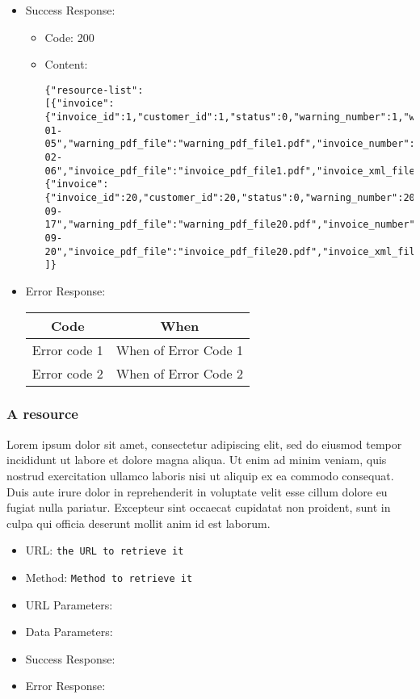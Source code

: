 \begin{itemize}
    \item Success Response: 
    \begin{itemize}
        \item Code: 200
        \item Content:
        \begin{lstlisting}
{"resource-list":
[{"invoice":{"invoice_id":1,"customer_id":1,"status":0,"warning_number":1,"warning_date":"2022-01-05","warning_pdf_file":"warning_pdf_file1.pdf","invoice_number":"1","invoice_date":"2022-02-06","invoice_pdf_file":"invoice_pdf_file1.pdf","invoice_xml_file":"invoice_xml_file1.xml","total":168.3,"discount":15.0,"pension_fund_refund":4.1,"has_stamp":false}},
{"invoice":{"invoice_id":20,"customer_id":20,"status":0,"warning_number":20,"warning_date":"2022-09-17","warning_pdf_file":"warning_pdf_file20.pdf","invoice_number":"20","invoice_date":"2022-09-20","invoice_pdf_file":"invoice_pdf_file20.pdf","invoice_xml_file":"invoice_xml_file20.xml","total":71.2,"discount":46.8,"pension_fund_refund":3.2,"has_stamp":false}}
]}
        \end{lstlisting}    
    \end{itemize}
    
    \item Error Response:
    \begin{table}[!h]
    \centering 
    \begin{tabular}{|c|c|}
    \hline
    \multicolumn{1}{|c|}{\textbf{Code}} & \multicolumn{1}{c|}{\textbf{When}} \\ \hline
    Error code 1 & When of Error Code 1 \\\hline
    Error code 2 & When of Error Code 2 \\\hline
    \end{tabular} 
    \end{table} 
    
\end{itemize}


\subsubsection*{A resource}


Lorem ipsum dolor sit amet, consectetur adipiscing elit, sed do eiusmod tempor incididunt ut labore et dolore magna aliqua. Ut enim ad minim veniam, quis nostrud exercitation ullamco laboris nisi ut aliquip ex ea commodo consequat. Duis aute irure dolor in reprehenderit in voluptate velit esse cillum dolore eu fugiat nulla pariatur. Excepteur sint occaecat cupidatat non proident, sunt in culpa qui officia deserunt mollit anim id est laborum.


\begin{itemize}
    \item URL: \texttt{the URL to retrieve it}
    \item Method: \texttt{Method to retrieve it}
    \item URL Parameters:
    \item Data Parameters: 
    \item Success Response:
    \item Error Response:
    
\end{itemize}

